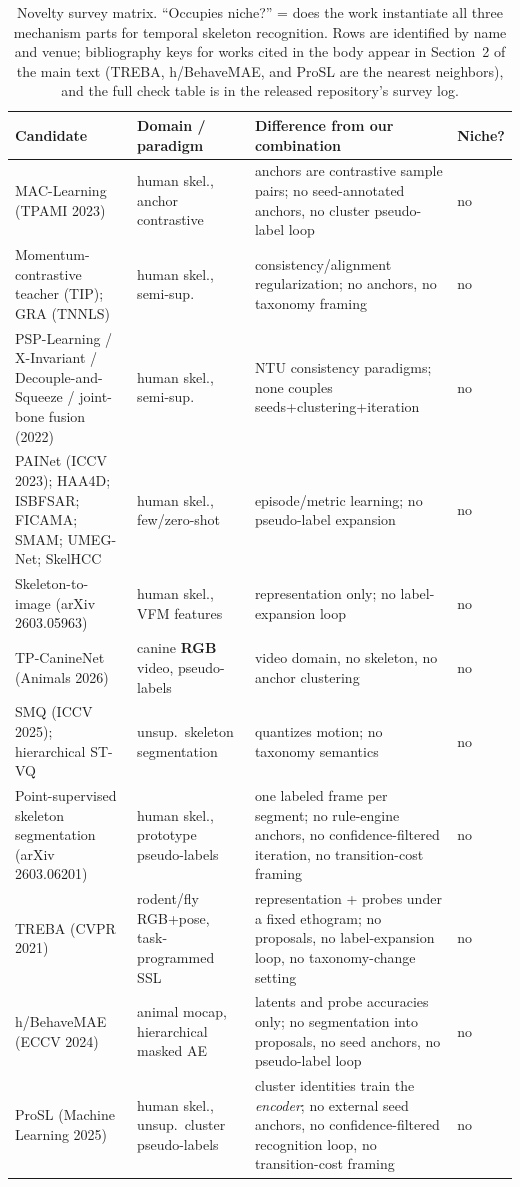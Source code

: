 \documentclass[11pt,a4paper]{article}
\begin{document}
\begin{table}[t]
\centering
\caption{Novelty survey matrix. ``Occupies niche?'' = does the work instantiate all three mechanism parts for temporal skeleton recognition. Rows are identified by name and venue; bibliography keys for works cited in the body appear in Section~2 of the main text (TREBA, h/BehaveMAE, and ProSL are the nearest neighbors), and the full check table is in the released repository's survey log.}
\label{tab:novelty}
\small
{}
\begin{tabularx}{\linewidth}{p{3.1cm}p{2.2cm}X p{1.2cm}}
\hline
Candidate & Domain / paradigm & Difference from our combination & Niche? \\
\hline
MAC-Learning (TPAMI 2023) & human skel., anchor contrastive & anchors are contrastive sample pairs; no seed-annotated anchors, no cluster pseudo-label loop & no \\
Momentum-contrastive teacher (TIP); GRA (TNNLS) & human skel., semi-sup. & consistency/alignment regularization; no anchors, no taxonomy framing & no \\
PSP-Learning / X-Invariant / Decouple-and-Squeeze / joint-bone fusion (2022) & human skel., semi-sup. & NTU consistency paradigms; none couples seeds+clustering+iteration & no \\
PAINet (ICCV 2023); HAA4D; ISBFSAR; FICAMA; SMAM; UMEG-Net; SkelHCC & human skel., few/zero-shot & episode/metric learning; no pseudo-label expansion & no \\
Skeleton-to-image (arXiv 2603.05963) & human skel., VFM features & representation only; no label-expansion loop & no \\
TP-CanineNet (Animals 2026) & canine \textbf{RGB} video, pseudo-labels & video domain, no skeleton, no anchor clustering & no \\
SMQ (ICCV 2025); hierarchical ST-VQ & unsup.\ skeleton segmentation & quantizes motion; no taxonomy semantics & no \\
Point-supervised skeleton segmentation (arXiv 2603.06201) & human skel., prototype pseudo-labels & one labeled frame per segment; no rule-engine anchors, no confidence-filtered iteration, no transition-cost framing & no \\
TREBA (CVPR 2021) & rodent/fly RGB+pose, task-programmed SSL & representation + probes under a fixed ethogram; no proposals, no label-expansion loop, no taxonomy-change setting & no \\
h/BehaveMAE (ECCV 2024) & animal mocap, hierarchical masked AE & latents and probe accuracies only; no segmentation into proposals, no seed anchors, no pseudo-label loop & no \\
ProSL (Machine Learning 2025) & human skel., unsup.\ cluster pseudo-labels & cluster identities train the \emph{encoder}; no external seed anchors, no confidence-filtered recognition loop, no transition-cost framing & no \\
\hline
\end{tabularx}
\end{table}
\end{document}
